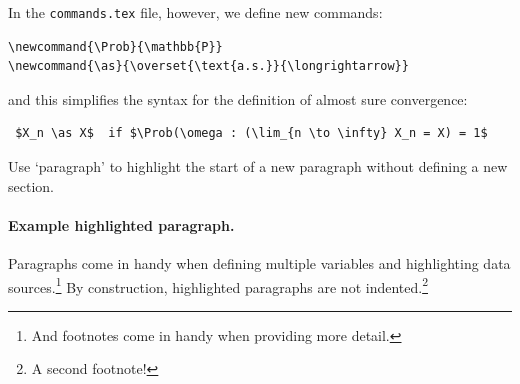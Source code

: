 In the \texttt{commands.tex} file, however, we define new commands:
\begin{verbatim}
\newcommand{\Prob}{\mathbb{P}}
\newcommand{\as}{\overset{\text{a.s.}}{\longrightarrow}}
\end{verbatim}
and this simplifies the syntax for the definition of almost sure convergence:

\begin{verbatim} $X_n \as X$  if $\Prob(\omega : (\lim_{n \to \infty} X_n = X) = 1$\end{verbatim}

Use `paragraph' to highlight the start of a new paragraph without defining a new section.

\paragraph{Example highlighted paragraph.}

Paragraphs come in handy when defining multiple variables and highlighting data sources.\footnote{And footnotes come in handy when providing more detail.} By construction, highlighted paragraphs are not indented.\footnote{A second footnote!}